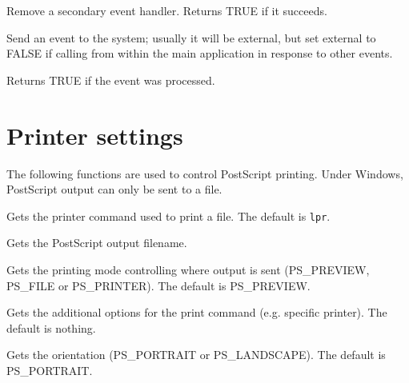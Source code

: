 
Remove a secondary event handler. Returns TRUE if it succeeds.

\label{wxsendevent}


Send an event to the system; usually it will be external, but set
external to FALSE if calling from within the main application in
response to other events.

Returns TRUE if the event was processed.

\section{Printer settings}\label{printersettings}

The following functions are used to control PostScript printing. Under
Windows, PostScript output can only be sent to a file.



Gets the printer command used to print a file. The default is {\tt lpr}.



Gets the PostScript output filename.



Gets the printing mode controlling where output is sent (PS\_PREVIEW, PS\_FILE or PS\_PRINTER).
The default is PS\_PREVIEW.



Gets the additional options for the print command (e.g. specific printer). The default is nothing.



Gets the orientation (PS\_PORTRAIT or PS\_LANDSCAPE). The default is PS\_PORTRAIT.



